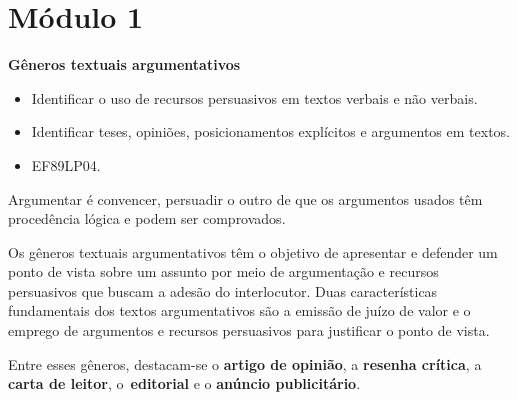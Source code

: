 \hypertarget{muxf3dulo-1}{%
\section{Módulo 1}\label{muxf3dulo-1}}

\textbf{Gêneros textuais argumentativos}


\begin{itemize}
\tightlist
\item
  Identificar o uso de recursos persuasivos em textos verbais e não
  verbais.
\item
  Identificar teses, opiniões, posicionamentos explícitos e argumentos
  em textos.
\end{itemize}


\begin{itemize}
\tightlist
\item
  EF89LP04.
\end{itemize}

Argumentar é convencer, persuadir o outro de que os argumentos usados
têm procedência lógica e podem ser comprovados.

Os gêneros textuais argumentativos têm o objetivo de apresentar e
defender um ponto de vista sobre um assunto por meio de argumentação e
recursos persuasivos que buscam a adesão do interlocutor. Duas
características fundamentais dos textos argumentativos são a emissão de
juízo de valor e o emprego de argumentos e recursos persuasivos para
justificar o ponto de vista.

Entre esses gêneros, destacam-se o \textbf{artigo de opinião}, a
\textbf{resenha crítica}, a \textbf{carta de leitor},
o~\textbf{editorial} e o \textbf{anúncio publicitário}.

